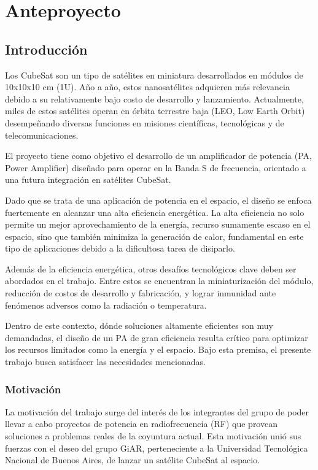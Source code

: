 \newpage
\section{Anteproyecto} \label{sec:anteproyecto}

\subsection{Introducción}
Los CubeSat son un tipo de satélites en miniatura desarrollados en módulos de 10x10x10 cm (1U). Año a año, estos nanosatélites adquieren más relevancia debido a su relativamente bajo costo de desarrollo y lanzamiento. Actualmente, miles de estos satélites operan en órbita terrestre baja (LEO, Low Earth Orbit) desempeñando diversas funciones en misiones científicas, tecnológicas y de telecomunicaciones.

El proyecto tiene como objetivo el desarrollo de un amplificador de potencia (PA, Power Amplifier) diseñado para operar en la Banda S de frecuencia, orientado a una futura integración en satélites CubeSat. 

Dado que se trata de una aplicación de potencia en el espacio, el diseño se enfoca fuertemente en alcanzar una alta eficiencia energética. La alta eficiencia no solo permite un mejor aprovechamiento de la energía, recurso sumamente escaso en el espacio, sino que también minimiza la generación de calor, fundamental en este tipo de aplicaciones debido a la dificultosa tarea de disiparlo.

Además de la eficiencia energética, otros desafíos tecnológicos clave deben ser abordados en el trabajo. Entre estos se encuentran la miniaturización del módulo, reducción de costos de desarrollo y fabricación, y lograr inmunidad ante fenómenos adversos como la radiación o temperatura.

Dentro de este contexto, dónde soluciones altamente eficientes son muy demandadas, el diseño de un PA de gran eficiencia resulta crítico para optimizar los recursos limitados como la energía y el espacio. Bajo esta premisa, el presente trabajo busca satisfacer las necesidades mencionadas.

\subsubsection{Motivación}
La motivación del trabajo surge del interés de los integrantes del grupo de poder llevar a cabo proyectos de potencia en radiofrecuencia (RF) que provean soluciones a problemas reales de la coyuntura actual. Esta motivación unió sus fuerzas con el deseo del grupo GiAR, perteneciente a la Universidad Tecnológica Nacional de Buenos Aires, de lanzar un satélite CubeSat al espacio.

